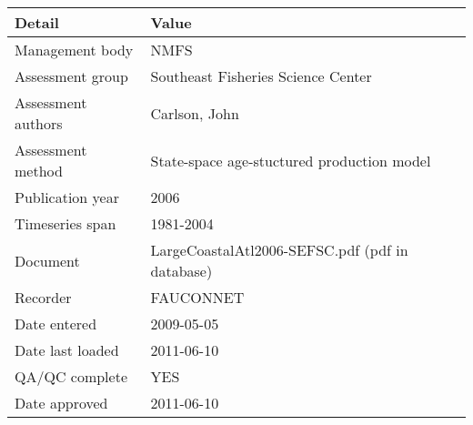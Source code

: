 \begin{table}[htb]
\centering
\begin{tabular}{lp{7cm}}
\toprule
Detail & Value \\
\midrule
Management body    & NMFS                                            \\
Assessment group   & Southeast Fisheries Science Center              \\
Assessment authors & Carlson, John                                   \\
Assessment method  & State-space age-stuctured production model      \\
Publication year   & 2006                                            \\
Timeseries span    & 1981-2004                                       \\
Document           & LargeCoastalAtl2006-SEFSC.pdf (pdf in database) \\
Recorder           & FAUCONNET                                       \\
Date entered       & 2009-05-05                                      \\
Date last loaded   & 2011-06-10                                      \\
QA/QC complete     & YES                                             \\
Date approved      & 2011-06-10                                      \\
\bottomrule
\end{tabular}
\label{tab:assessdet}
\end{table}
